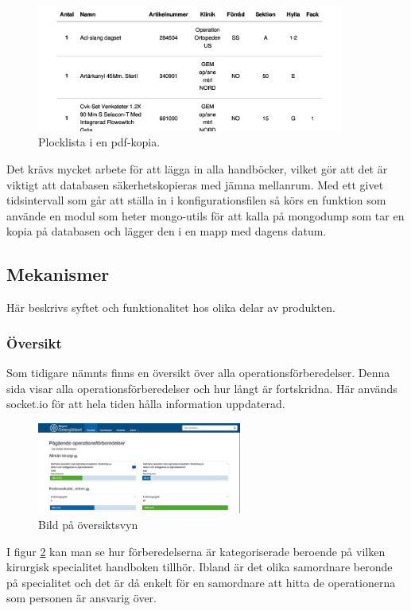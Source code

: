 \begin{figure}
  \centering
  \includegraphics[width=0.9\textwidth]{images/pdf-end.png}
  \caption{Plocklista i en pdf-kopia.}
  \label{fig:pdf-end}
\end{figure}

Det krävs mycket arbete för att lägga in alla handböcker, vilket gör att det är viktigt att databasen säkerhetskopieras med jämna mellanrum. Med ett givet tidsintervall som går att ställa in i konfigurationsfilen så körs en funktion som använde en modul som heter mongo-utils för att kalla på mongodump som tar en kopia på databasen och lägger den i en mapp med dagens datum. 
\subsection{Mekanismer}
Här beskrivs syftet och funktionalitet hos olika delar av produkten.

\subsubsection{Översikt}
Som tidigare nämnts finns en översikt över alla operationsförberedelser.
Denna sida visar alla operationsförberedelser och hur långt är fortskridna.
Här används socket.io för att hela tiden hålla information uppdaterad.

\begin{figure}
  \centering
  \includegraphics[width=0.6\textwidth]{images/site/overview.png}
  \caption{Bild på översiktsvyn}
  \label{fig:siteoverview}
\end{figure}

I figur \ref{fig:siteoverview} kan man se hur förberedelserna är kategoriserade beroende på vilken kirurgisk specialitet handboken tillhör.
Ibland är det olika samordnare beronde på specialitet och det är då enkelt för en samordnare att hitta de operationerna som personen är ansvarig över.

